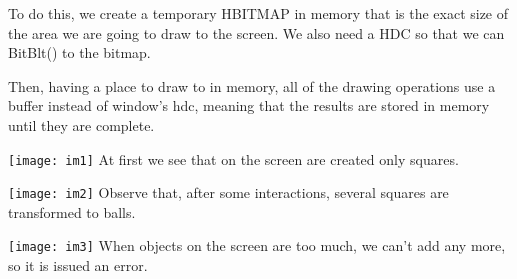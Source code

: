 To do this, we create a temporary HBITMAP in memory that is the exact size of the area we are going to draw to the screen. We also need a HDC so that we can BitBlt() to the bitmap.

Then, having a place to draw to in memory, all of the drawing operations use a buffer instead of window's hdc, meaning that the results are stored in memory until they are complete.

\texttt{[image: im1]}
At first we see that on the screen are created only squares.

\texttt{[image: im2]}
Observe that, after some interactions, several squares are transformed to balls.



\texttt{[image: im3]}
When objects on the screen are too much, we can't add any more, so it is issued an error. 



\clearpage